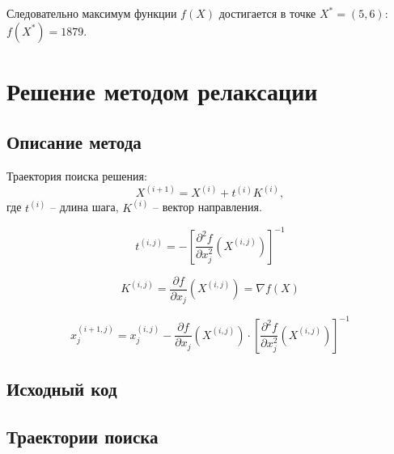 Следовательно максимум функции $f(X)$ достигается в точке $X^* = (5, 6)$: $f(X^*) = 1879$.

\section{Решение методом релаксации}

\subsection{Описание метода}

Траектория поиска решения:
\begin{equation*}
X^{(i+1)}  = X^{(i)} + t^{(i)} K^{(i)},
\end{equation*}
где $t^{(i)}$ -- длина шага, $K^{(i)}$ -- вектор направления.

\begin{equation*}
t^{(i,j)} = -\left[ \dfrac{\partial^2 f}{\partial x_j^2} \left(X^{(i,j)} \right) \right]^{-1}
\end{equation*}

\begin{equation*}
K^{(i,j)} = \dfrac{\partial f}{\partial x_j}\left( X^{(i,j)} \right) = \nabla f(X)
\end{equation*}

\begin{equation*}
x_j^{(i+1,j)} = x_j^{(i,j)} - \dfrac{\partial f}{\partial x_j}\left( X^{(i,j)} \right) \cdot \left[ \dfrac{\partial^2 f}{\partial x_j^2} \left(X^{(i,j)} \right) \right]^{-1}
\end{equation*}

%
%
%
%

\subsection{Исходный код}



\subsection{Траектории поиска}

